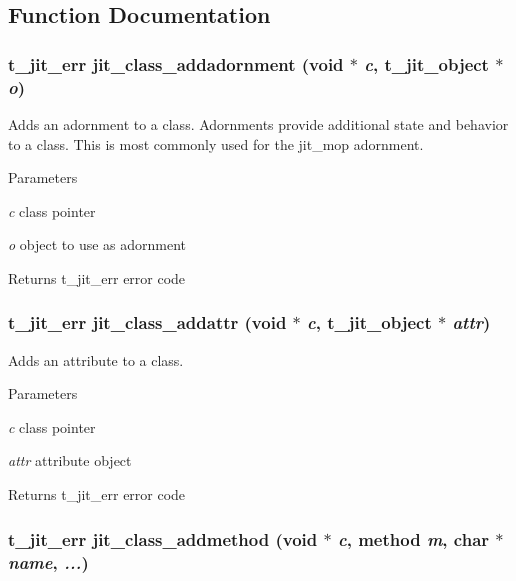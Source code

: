 \subsection{Function Documentation}
\hypertarget{group__classmod_ga408738c800435bf50d092ce52b223327}{
\subsubsection[{jit\_\-class\_\-addadornment}]{\setlength{\rightskip}{0pt plus 5cm}t\_\-jit\_\-err jit\_\-class\_\-addadornment (void $\ast$ {\em c}, \/  {\bf t\_\-jit\_\-object} $\ast$ {\em o})}}
\label{group__classmod_ga408738c800435bf50d092ce52b223327}


Adds an adornment to a class. Adornments provide additional state and behavior to a class. This is most commonly used for the jit\_\-mop adornment.


\begin{DoxyParams}{Parameters}
\item[{\em c}]class pointer \item[{\em o}]object to use as adornment\end{DoxyParams}
\begin{DoxyReturn}{Returns}
t\_\-jit\_\-err error code 
\end{DoxyReturn}
\hypertarget{group__classmod_ga37e39db544b4d73596da1557e6c7563a}{
\subsubsection[{jit\_\-class\_\-addattr}]{\setlength{\rightskip}{0pt plus 5cm}t\_\-jit\_\-err jit\_\-class\_\-addattr (void $\ast$ {\em c}, \/  {\bf t\_\-jit\_\-object} $\ast$ {\em attr})}}
\label{group__classmod_ga37e39db544b4d73596da1557e6c7563a}


Adds an attribute to a class. 
\begin{DoxyParams}{Parameters}
\item[{\em c}]class pointer \item[{\em attr}]attribute object\end{DoxyParams}
\begin{DoxyReturn}{Returns}
t\_\-jit\_\-err error code 
\end{DoxyReturn}
\hypertarget{group__classmod_gab3b84bc08f9f3ee0b29010f653c5ea77}{
\subsubsection[{jit\_\-class\_\-addmethod}]{\setlength{\rightskip}{0pt plus 5cm}t\_\-jit\_\-err jit\_\-class\_\-addmethod (void $\ast$ {\em c}, \/  {\bf method} {\em m}, \/  char $\ast$ {\em name}, \/   {\em ...})}}
\label{group__classmod_gab3b84bc08f9f3ee0b29010f653c5ea77}


